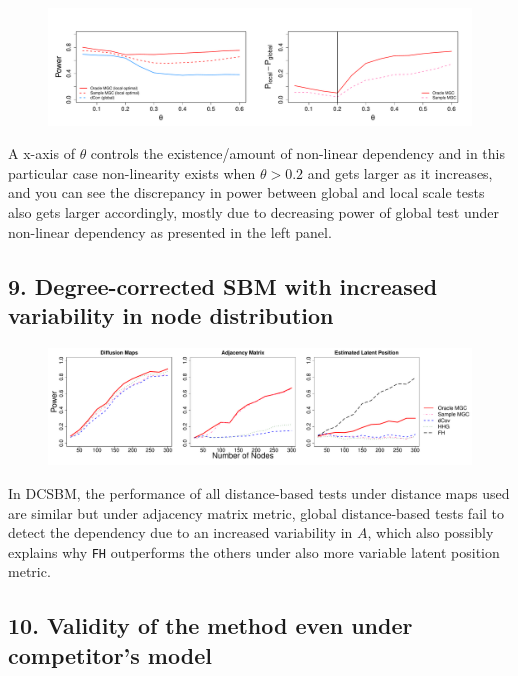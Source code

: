 \documentclass[12pt]{article}
\begin{document}
\begin{figure}[H]
	\centering
	\includegraphics[width=6in]{../Figure/powerplot.pdf}
	\label{fig:powerplot}
\end{figure}

A x-axis of $\theta$ controls the existence/amount of non-linear dependency and in this particular case non-linearity exists when $\theta > 0.2$ and gets larger as it increases, and you can see the discrepancy in power between global and local scale tests also gets larger accordingly, mostly due to decreasing power of global test under non-linear dependency as presented in the left panel.

\subsection*{9. Degree-corrected SBM with increased variability in node distribution}	

\begin{figure}[H]
	\centering
	\includegraphics[width=6in]{../Figure/dcSBM.pdf}
	\label{fig:dcSBM}
\end{figure}	

In DCSBM, the performance of all distance-based tests under distance maps used are similar but under adjacency matrix metric, global distance-based tests fail to detect the dependency due to an increased variability in $A$, which also possibly explains why \texttt{FH} outperforms the others under also more variable latent position metric.


\subsection*{10. Validity of the method even under competitor's model}
\end{document}
